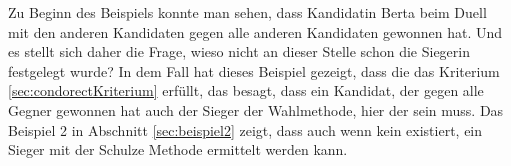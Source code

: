 Zu Beginn des Beispiels konnte man sehen, dass Kandidatin Berta beim Duell mit den anderen Kandidaten gegen alle anderen Kandidaten gewonnen hat. Und es stellt sich daher die Frage, wieso nicht an dieser Stelle schon die Siegerin festgelegt wurde? In dem Fall hat dieses Beispiel gezeigt, dass die \schulze das \condorcet Kriterium \ref{sec:condorectKriterium} erfüllt, das besagt, dass ein Kandidat, der gegen alle Gegner gewonnen hat auch der Sieger der Wahlmethode, hier der \schulze sein muss. Das Beispiel 2 in Abschnitt \ref{sec:beispiel2} zeigt, dass auch wenn kein \condorcetSieger existiert, ein Sieger mit der Schulze Methode ermittelt werden kann.



